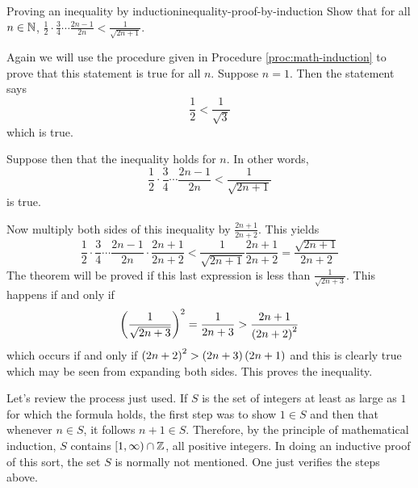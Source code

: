 \begin{example}{Proving an inequality by induction}{inequality-proof-by-induction}
Show that for all $n\in \mathbb{N}$, $\displaystyle \frac{1}{2}\cdot 
\displaystyle \frac{3}{4}\cdots \displaystyle \frac{2n-1}{2n}<\displaystyle
\frac{1}{\sqrt{2n+1}}$.
\end{example}

\begin{solution}
Again we will use the procedure given in Procedure \ref{proc:math-induction} to prove that this statement is true for all $n$.
Suppose $n=1$. Then the statement says 
\begin{equation*}
\frac{1}{2}< \frac{1}{\sqrt{3}}
\end{equation*}
 which is true. 

Suppose then that
the inequality holds for $n$. In other words, 
\begin{equation*}
 \frac{1}{2}\cdot \frac{3}{4}\cdots \frac{2n-1}{2n} < \frac{1}{\sqrt{2n+1}}
\end{equation*}
is true.

Now multiply both sides of this inequality by $\frac{2n+1}{2n+2}$.
This yields
\begin{equation*}
\frac{1}{2}\cdot \frac{3}{4}\cdots \frac{2n-1}{2n}\cdot \frac{2n+1}{2n+2}<
\frac{1}{\sqrt{2n+1}}\frac{2n+1}{2n+2}=\frac{\sqrt{2n+1}}{2n+2}
\end{equation*}
The theorem will be proved if this last expression is less than $
\displaystyle\frac{1}{\sqrt{2n+3}}$. This happens if and only if
\begin{equation*}
\left(\frac{1}{\sqrt{2n+3}}\right) ^{2}=\frac{1}{2n+3}>\frac{2n+1}{\left(
2n+2\right) ^{2}}
\end{equation*}
which occurs if and only if $\left(2n+2\right) ^{2}>\left(2n+3\right)
\left(2n+1\right) $ and this is clearly true which may be seen from
expanding both sides. This proves the inequality.
\end{solution}

Let's review the process just used. If $S$ is the set of integers at least as
large as $1$ for which the formula holds, the first step was to show $1\in S$
and then that whenever $n\in S$, it follows $n+1\in S$. Therefore, by the
principle of mathematical induction, $S$ contains $[1,\infty )\cap \mathbb{Z}
$, all positive integers. In doing an inductive proof of this sort, the set $
S$ is normally not mentioned. One just verifies the steps above. 
